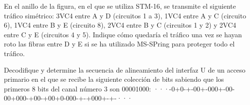 \begin{exercise}[5]
	En el anillo de la figura, en el que se utiliza STM-16, se transmite el siguiente tráfico simétrico: 3VC4 entre A y D (circuitos 1 a 3), 1VC4 entre A y C (circuito 6), 1VC4 entre B y E (circuito 8), 2VC4 entre B y C (circuitos 1 y 2) y 2VC4 entre C y E (circuitos 4 y 5). Indique cómo quedaría el tráfico una vez se hayan roto las fibras entre D y E si se ha utilizado MS-SPring para proteger todo el tráfico.
\end{exercise}
\begin{exercise}[6]
	Decodifique y determine la secuencia de alineamiento del interfaz U de un acceso primario en el que se recibe la siguiente colección de bits sabiendo que los primeros 8 bits del canal número 3 son 00001000: ···-0+0-+-00+-000+-00-00+000-+00-+00+0-000-+-+000+-+-···
\end{exercise}
